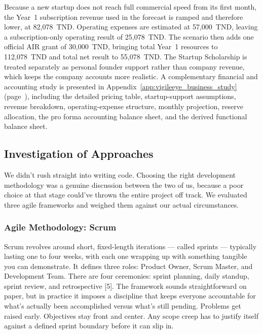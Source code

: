 \documentclass[12pt,a4paper,oneside]{report}
\begin{document}
\hspace{0.8cm}Because a new startup does not reach full commercial speed from its first month, the Year~1 subscription revenue used in the forecast is ramped and therefore lower, at 82{,}078~TND. Operating expenses are estimated at 57{,}000~TND, leaving a subscription-only operating result of 25{,}078~TND. The scenario then adds one official AIR grant of 30{,}000~TND, bringing total Year~1 resources to 112{,}078~TND and total net result to 55{,}078~TND. The Startup Scholarship is treated separately as personal founder support rather than company revenue, which keeps the company accounts more realistic. A complementary financial and accounting study is presented in Appendix~\ref{app:vigileeye_business_study} (page~\pageref{app:vigileeye_business_study}), including the detailed pricing table, startup-support assumptions, revenue breakdown, operating-expense structure, monthly projection, reserve allocation, the pro forma accounting balance sheet, and the derived functional balance sheet.

\subsection{Investigation of Approaches}
\label{subsec:methodology_study}

\hspace{0.8cm}We didn't rush straight into writing code. Choosing the right development methodology was a genuine discussion between the two of us, because a poor choice at that stage could've thrown the entire project off track. We evaluated three agile frameworks and weighed them against our actual circumstances.

\enlargethispage{8\baselineskip}
\subsubsection{Agile Methodology: Scrum}
\hspace{0.8cm}Scrum revolves around short, fixed-length iterations — called sprints — typically lasting one to four weeks, with each one wrapping up with something tangible you can demonstrate. It defines three roles: Product Owner, Scrum Master, and Development Team. There are four ceremonies: sprint planning, daily standup, sprint review, and retrospective [5]. The framework sounds straightforward on paper, but in practice it imposes a discipline that keeps everyone accountable for what's actually been accomplished versus what's still pending. Problems get raised early. Objectives stay front and center. Any scope creep has to justify itself against a defined sprint boundary before it can slip in.
\end{document}
